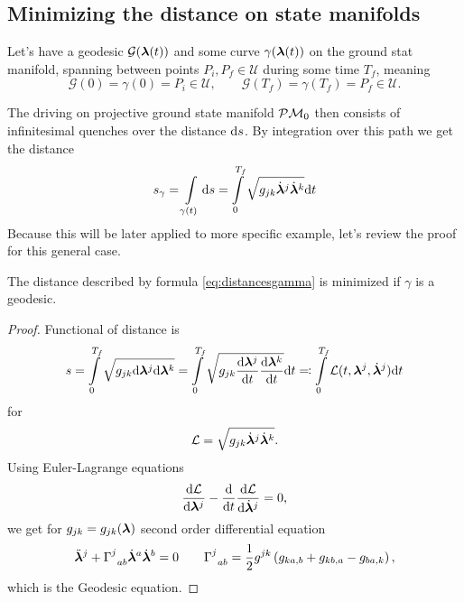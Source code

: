\subsection{Minimizing the distance on state manifolds}
Let's have a geodesic $\mathcal G({\bm\lambda}(t))$ and some curve $\gamma({\bm\lambda}(t))$ on the ground stat manifold, spanning between points $P_i,P_f\in \mathcal U$ during some time $T_f$, meaning
 $$\mathcal{G}(0)=\gamma(0)=P_i\in\mathcal U,\qquad \mathcal{G}(T_f)=\gamma(T_f)=P_f\in\mathcal U.$$

The driving on projective ground state manifold $\mathcal{P}\mathcal{M}_0$ then consists of infinitesimal quenches over the distance $\mathrm{d} s$. By integration over this path we get the distance
\begin{equation}
    s_\gamma=\int\limits_{\gamma(t)}\mathrm{d} s=\int\limits_{0}^{T_f}\sqrt{g_{jk}\dot{{\bm\lambda}}^j\dot{{\bm\lambda}}^k}\mathrm{d} t
    \label{eq:distancesgamma}
\end{equation}
Because this will be later applied to more specific example, let's review the proof for this general case.
\begin{thm}
    The distance described by formula \ref{eq:distancesgamma} is minimized if $\gamma$ is a geodesic.
\end{thm}

\begin{proof}
    Functional of distance is
    \begin{equation}
        s=\int\limits_0^{T_f} \sqrt{g_{jk}\mathrm{d}{\bm\lambda}^j\mathrm{d}{\bm\lambda}^k}=\int\limits_0^{T_f} \sqrt{g_{jk}\frac{\mathrm{d} {\bm\lambda}^j}{\mathrm{d} t}\frac{\mathrm{d} {\bm\lambda}^k}{\mathrm{d} t}}\mathrm{d} t \eqqcolon \int\limits_0^{T_f} \mathcal{L}(t,{\bm\lambda}^j,\dot{{\bm\lambda}}^j)\mathrm{d} t
    \end{equation}
    for 
    \begin{equation}
        \mathcal{L}=\sqrt{g_{jk}\dot{{\bm\lambda}}^j\dot{{\bm\lambda}}^k}.
    \end{equation}
    Using Euler-Lagrange equations 
    \begin{equation}
        \frac{\mathrm{d} \mathcal{L}}{\mathrm{d} {\bm\lambda}^j}-\frac{\mathrm{d} }{\mathrm{d} t}\frac{\mathrm{d} \mathcal{L}}{\mathrm{d} \dot{{\bm\lambda}}^j}=0,
    \end{equation}
    we get for $g_{jk}=g_{jk}({\bm\lambda})$ second order differential equation
    \begin{equation}
        \ddot{{\bm\lambda}}^j+\Gamma^j_{\;\;ab}\dot{{\bm\lambda}}^a\dot{{\bm\lambda}}^b=0\qquad \Gamma^j_{\;\;ab}=\frac{1}{2}g^{jk}\left(g_{ka,b}+g_{kb,a}-g_{ba,k}\right),
        \label{eq:geodesicEquaiton}
    \end{equation}
    which is the Geodesic equation.
\end{proof}




